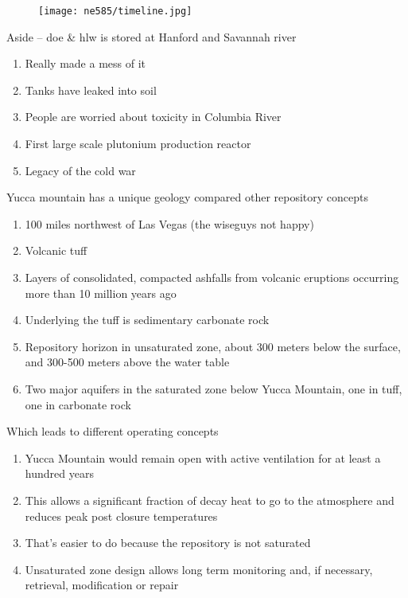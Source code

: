 \documentclass[aspectratio=1610,pdftex,dvipsnames,compress,xcolor={dvipsnames}]{beamer}
\newcommand{\acs}{\acrshort} %
\begin{document}
\begin{frame}{}
    \begin{figure}
        \centering
        \texttt{[image: ne585/timeline.jpg]}
    \end{figure}
\end{frame}


\begin{frame}{Aside -- \acs{doe} \& \acs{hlw} is stored at Hanford and Savannah river}
    \begin{enumerate}[series=outerlist,topsep=0pt,itemsep=21pt,leftmargin=*,label=(\arabic*)]
        \item[]Really made a mess of it
        \item[]Tanks have leaked into soil
        \item[]People are worried about toxicity in Columbia River
        \item[]First large scale plutonium production reactor
        \item[]Legacy of the cold war
    \end{enumerate}
\end{frame}


\begin{frame}{Yucca mountain has a unique geology compared other repository concepts}
    \begin{enumerate}[series=outerlist,topsep=0pt,itemsep=18pt,leftmargin=*,label=(\arabic*)]
        \item[]100 miles northwest of Las Vegas (the wiseguys not happy)
        \item[]Volcanic tuff
        \item[]Layers of consolidated, compacted ashfalls from volcanic eruptions occurring more than 10 million years ago 
        \item[]Underlying the tuff is sedimentary carbonate rock
        \item[]Repository horizon in unsaturated zone, about 300 meters below the surface, and 300-500 meters above the water table
        \item[]Two major aquifers in the saturated zone below Yucca Mountain, one in tuff, one in carbonate rock
    \end{enumerate}
\end{frame}


\begin{frame}{Which leads to different operating concepts}
    \begin{enumerate}[series=outerlist,topsep=0pt,itemsep=18pt,leftmargin=*,label=(\arabic*)]
        \item[]Yucca Mountain would remain open with active ventilation for at least a hundred years
        \item[]This allows a significant fraction of decay heat to go to the atmosphere and reduces peak post closure temperatures
        \item[]That's easier to do because the repository is not saturated
        \item[]Unsaturated zone design allows long term monitoring and, if necessary, retrieval, modification or repair
    \end{enumerate}
\end{frame}
\end{document}
